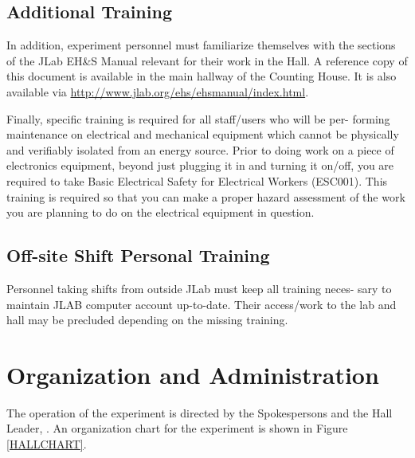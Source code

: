 \documentclass[11pt]{article}
\begin{document}
\subsection{Additional Training}
In addition, experiment personnel must familiarize themselves with the 
sections of the JLab EH\&S Manual relevant for their work in the Hall. 
A reference copy of this
document is available in the main hallway of the Counting House. It is also
available via \url{http://www.jlab.org/ehs/ehsmanual/index.html}.

Finally, specific training is required for all staff/users who will be per- forming maintenance on electrical and 
mechanical equipment which cannot be physically and verifiably isolated from an energy source. Prior to 
doing work on a piece of electronics equipment, beyond just plugging it in and turning it on/off, you are 
required to take Basic Electrical Safety for Electrical Workers (ESC001). This training is required so 
that you can make a proper hazard assessment of the work you are planning to do on the electrical 
equipment in question.


\subsection{Off-site Shift Personal Training}
Personnel taking shifts from outside JLab must keep all training neces- sary to maintain JLAB computer 
account up-to-date. Their access/work to the lab and hall may be precluded depending on the missing training.

\section{ Organization  and Administration}
\indent

The operation of the experiment is directed by the Spokespersons and the Hall 
Leader, \HALLLEADER. An organization chart for the experiment is
shown in Figure \ref{HALLCHART}.
\end{document}
